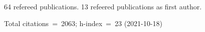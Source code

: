 64 refereed publications. 13 refeered publications as first author.

Total citations~=~2063; h-index~=~23 (2021-10-18)